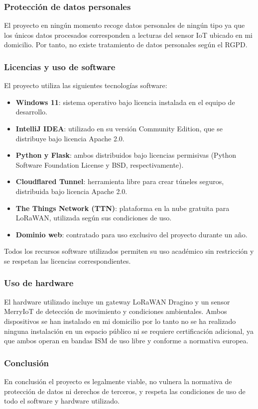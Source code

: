 \subsubsection{Protección de datos personales}

El proyecto en ningún momento recoge datos personales de ningún tipo ya que los únicos datos procesados corresponden a lecturas del sensor IoT ubicado en mi domicilio.
Por tanto, no existe tratamiento de datos personales según el RGPD.

\subsubsection{Licencias y uso de software}

El proyecto utiliza las siguientes tecnologías software:

\begin{itemize}
    \item \textbf{Windows 11}: sistema operativo bajo licencia instalada en el equipo de desarrollo.
    \item \textbf{IntelliJ IDEA}: utilizado en su versión Community Edition, que se distribuye bajo licencia Apache 2.0.
    \item \textbf{Python y Flask}: ambos distribuidos bajo licencias permisivas (Python Software Foundation License y BSD, respectivamente).
    \item \textbf{Cloudflared Tunnel}: herramienta libre para crear túneles seguros, distribuida bajo licencia Apache 2.0.
    \item \textbf{The Things Network (TTN)}: plataforma en la nube gratuita para LoRaWAN, utilizada según sus condiciones de uso.
    \item \textbf{Dominio web}: contratado para uso exclusivo del proyecto durante un año.
\end{itemize}

Todos los recursos software utilizados permiten su uso académico sin restricción y se respetan las licencias correspondientes.

\subsubsection{Uso de hardware}

El hardware utilizado incluye un gateway LoRaWAN Dragino y un sensor MerryIoT de detección de movimiento y condiciones ambientales. Ambos dispositivos se han instalado en mi domicilio por lo tanto no se ha realizado ninguna instalación en un espacio público ni se requiere certificación adicional, ya que ambos operan en bandas ISM de uso libre y conforme a normativa europea.

\subsubsection{Conclusión}

En conclusión  el proyecto es legalmente viable, no vulnera la normativa de protección de datos ni derechos de terceros, y respeta las condiciones de uso de todo el software y hardware utilizado.



